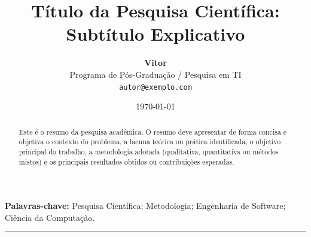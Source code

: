 \documentclass[12pt,a4paper]{article}
\title{\textbf{Título da Pesquisa Científica: Subtítulo Explicativo}}
\author{
    \textbf{Vitor}\\
    Programa de Pós-Graduação / Pesquisa em TI\\
    \texttt{autor@exemplo.com}
}
\date{\today}
\begin{document}

\maketitle

\begin{abstract}
Este é o resumo da pesquisa acadêmica. O resumo deve apresentar de forma concisa e objetiva o contexto do problema, a lacuna teórica ou prática identificada, o objetivo principal do trabalho, a metodologia adotada (qualitativa, quantitativa ou métodos mistos) e os principais resultados obtidos ou contribuições esperadas.
\end{abstract}

\textbf{Palavras-chave:} Pesquisa Científica; Metodologia; Engenharia de Software; Ciência da Computação.

\vspace{1em}
\hrule
\vspace{1.5em}







\newpage


\end{document}
